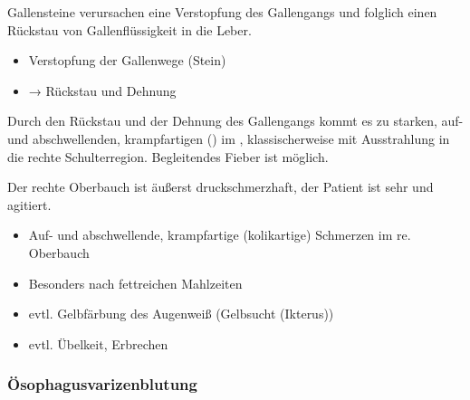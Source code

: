 

{Gallensteine verursachen eine Verstopfung des
Gallengangs und folglich einen Rückstau von
Gallenflüssigkeit in die Leber.
} 
{
\begin{itemize}
  \item Verstopfung der Gallenwege (Stein)
  \item → Rückstau und Dehnung
\end{itemize}
}{}{}{}

{%
Durch den Rückstau und der Dehnung des Gallengangs kommt es zu
starken, auf- und abschwellenden, krampfartigen
()  im ,
klassischerweise mit Ausstrahlung in die rechte Schulterregion. Begleitendes Fieber ist möglich.

Der rechte Oberbauch ist äußerst druckschmerzhaft, der
Patient ist sehr  und agitiert.
}{
\begin{itemize}
  \item Auf- und abschwellende, krampfartige
  (kolikartige) Schmerzen im re. Oberbauch
  \item Besonders nach fettreichen Mahlzeiten
  \item evtl. Gelbfärbung des Augenweiß (Gelbsucht (Ikterus))
  \item evtl. Übelkeit, Erbrechen
\end{itemize}
}{}{}{}



\subsubsection{Ösophagusvarizenblutung}

\nopagebreak[4]

